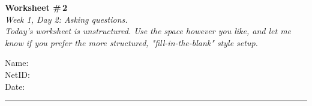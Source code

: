 \documentclass[11pt]{article}
\begin{document}
\noindent
\begin{minipage}[t]{0.55\textwidth}
  \vspace{0pt}
  {\LARGE \textbf{Worksheet \#\,2}} \\[0.3em]
  {\large \textit{Week 1, Day 2: Asking questions.} \\[0.3em] \textit{Today's worksheet is unstructured. Use the space however you like, and let me know if you prefer the more structured, "fill-in-the-blank" style setup.}}
\end{minipage}
\hfill
\begin{minipage}[t]{0.40\textwidth}
  \vspace{0pt}
  \begin{mdframed}[linecolor=black, linewidth=1pt, innertopmargin=10pt, innerbottommargin=10pt]
    \small
    \vspace{0.4cm}
    Name: \underline{\hspace{4.5cm}} \\[1em]
    NetID: \underline{\hspace{4.3cm}} \\[1em]
    Date: \underline{\hspace{4.4cm}} \\
  \end{mdframed}
\end{minipage}

\vspace{1em}
\noindent\rule{\linewidth}{1pt}
\vspace{0.2em}
\end{document}
